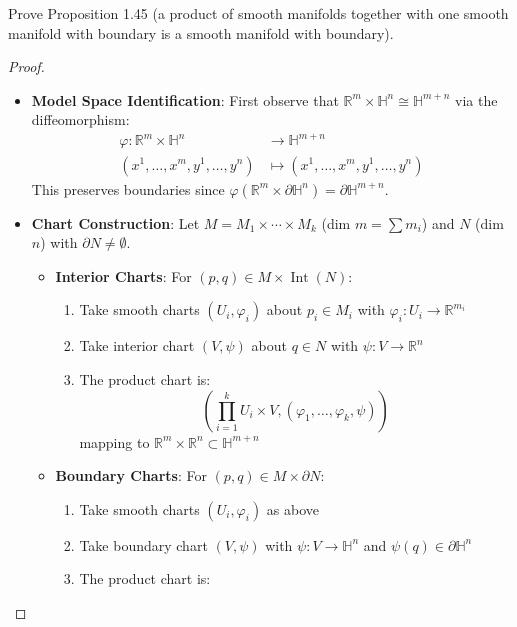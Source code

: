 \begin{problem}
  Prove Proposition 1.45 (a product of smooth manifolds together with one smooth manifold with boundary is a smooth manifold with boundary).
  \begin{proof}
  \begin{itemize}
    \item \textbf{Model Space Identification}: 
      First observe that $\mathbb{R}^m \times \mathbb{H}^n \cong \mathbb{H}^{m+n}$ via the diffeomorphism:
      \begin{align*}
        \varphi \colon \mathbb{R}^m \times \mathbb{H}^n &\to \mathbb{H}^{m+n} \\
        (x^1,\ldots,x^m,y^1,\ldots,y^n) &\mapsto (x^1,\ldots,x^m,y^1,\ldots,y^n)
      \end{align*}
      This preserves boundaries since $\varphi(\mathbb{R}^m \times \partial\mathbb{H}^n) = \partial\mathbb{H}^{m+n}$.
      \item \textbf{Chart Construction}:
        Let $M = M_1 \times \cdots \times M_k$ (dim $m = \sum m_i$) and $N$ (dim $n$) with $\partial N \neq \emptyset$.
        \begin{itemize}
          \item \textbf{Interior Charts}: For $(p,q) \in M \times \operatorname{Int}(N)$:
          \begin{enumerate}
            \item Take smooth charts $(U_i,\varphi_i)$ about $p_i \in M_i$ with $\varphi_i \colon U_i \to \mathbb{R}^{m_i}$
            \item Take interior chart $(V,\psi)$ about $q \in N$ with $\psi \colon V \to \mathbb{R}^n$
            \item The product chart is:
              $$
              \left( \prod_{i=1}^k U_i \times V, (\varphi_1,\ldots,\varphi_k,\psi) \right)
              $$
              mapping to $\mathbb{R}^m \times \mathbb{R}^n \subset \mathbb{H}^{m+n}$
          \end{enumerate}
          \item \textbf{Boundary Charts}: For $(p,q) \in M \times \partial N$:   
          \begin{enumerate}
            \item Take smooth charts $(U_i,\varphi_i)$ as above
            \item Take boundary chart $(V,\psi)$ with $\psi \colon V \to \mathbb{H}^n$ and $\psi(q) \in \partial\mathbb{H}^n$
            \item The product chart is:

\end{enumerate}
\end{itemize}
\end{itemize}
\end{proof}
\end{problem}
